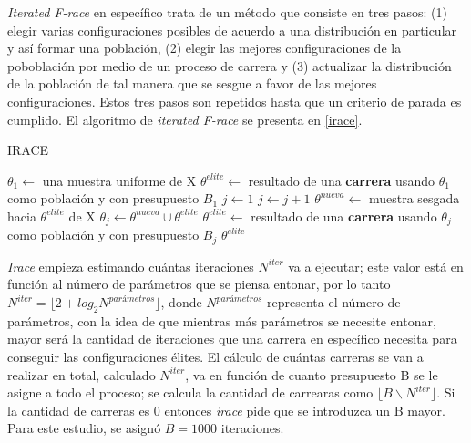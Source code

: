 \emph{Iterated F-race} en específico trata de un método que consiste en tres pasos: (1) elegir varias configuraciones posibles de acuerdo a una distribución en particular y así formar una población, (2) elegir las mejores configuraciones de la poboblación por medio de un proceso de carrera y (3) actualizar la distribución de la población de tal manera que se sesgue a favor de las mejores configuraciones. Estos tres pasos son repetidos hasta que un criterio de parada es cumplido. El algoritmo de \emph{iterated F-race} se presenta en \ref{irace}.

\begin{algorithm}
\caption{IRACE}
\label{irace}
\begin{algorithmic}[1]


\State $\theta_1 \gets$ una muestra uniforme de X
\State $\theta^{elite} \gets$ resultado de una \textbf{carrera} usando $\theta_1$ como población y con presupuesto $B_1$
\State $j \gets 1$
	\State $j \gets j + 1$
	\State $\theta^{nueva} \gets$ muestra sesgada hacia $\theta^{elite}$ de X 
	\State $\theta_j \gets \theta^{nueva} \cup \theta^{elite}$
	\State $\theta^{elite} \gets$ resultado de una \textbf{carrera} usando $\theta_j$ como población y con presupuesto $B_j$
\EndWhile
\State \Return $\theta^{elite}$

\end{algorithmic}
\end{algorithm}

\emph{Irace} empieza estimando cuántas iteraciones $N^{iter}$ va a ejecutar; este valor está en función al número de parámetros que se piensa entonar, por lo tanto $N^{iter} = \lfloor 2 + log_2 N^{parámetros} \rfloor$, donde $N^{parámetros}$ representa el número de parámetros, con la idea de que mientras más parámetros se necesite entonar, mayor será la cantidad de iteraciones que una carrera en específico necesita para conseguir las configuraciones élites. El cálculo de cuántas carreras se van a realizar en total, calculado $N^{iter}$, va en función de cuanto presupuesto B se le asigne a todo el proceso; se calcula la cantidad de carrearas como $\lfloor B \backslash N^{iter} \rfloor$. Si la cantidad de carreras es 0 entonces \emph{irace} pide que se introduzca un B mayor. Para este estudio, se asignó $ B = 1000$ iteraciones.

